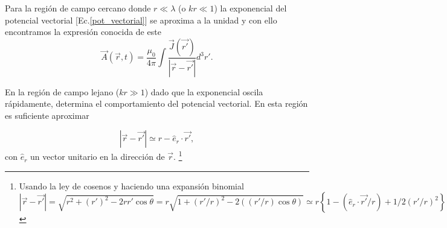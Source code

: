 Para la región de campo cercano donde $r\ll\lambda$ (o $kr\ll 1$) la exponencial del potencial vectorial [Ec.\ref{pot_vectorial}] se aproxima a la unidad y con ello encontramos la expresión conocida de este \cite{Jackson}
\begin{equation*}
	\Vec{A}(\Vec{r},t)=\frac{\mu_0}{4\pi}\int \frac{\Vec{J}(\Vec{r'})}{|\Vec{r}-\Vec{r'}|} d^3r'.
\end{equation*} 


En la región de campo lejano ($kr\gg 1$) dado que la exponencial oscila rápidamente, determina el comportamiento del potencial vectorial. En esta región es suficiente aproximar

\begin{equation}
	|\Vec{r}-\Vec{r'}|\simeq r-\hat{e}_r\cdot\Vec{r'},    
\end{equation}
con $\hat{e}_r$ un vector unitario en la dirección de $\Vec{r}$. \footnote{Usando la ley de cosenos y haciendo una expansión binomial $
	|\Vec{r}-\Vec{r'}|=\sqrt{r^2+(r')^2-2rr'\cos\theta}=r\sqrt{1+\left(r'/r\right)^2-2\left((r'/r)\cos\theta\right)}\simeq r\left\{1-(\hat{e}_r\cdot\Vec{r'}/r)+1/2\left(r'/r\right)^2\right\}\simeq r-\hat{e}_r\cdot\Vec{r'}.$}
	
